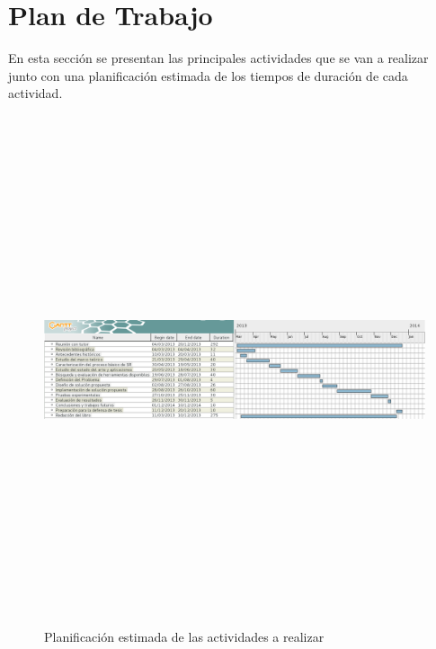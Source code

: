 \section{Plan de Trabajo}
\label{sec:plan}

En esta secci\'{o}n se presentan las principales actividades que se van a realizar junto con una 
planificaci\'{o}n estimada de los tiempos de duraci\'{o}n de cada actividad.

\begin{landscape}
\thispagestyle{empty}
\begin{figure}
    \centering
    \includegraphics[width=25cm,height=15cm]{./graphics/gantt}
    \caption{Planificaci\'{o}n estimada de las actividades a realizar}
\end{figure}
\end{landscape}
\restoregeometry
